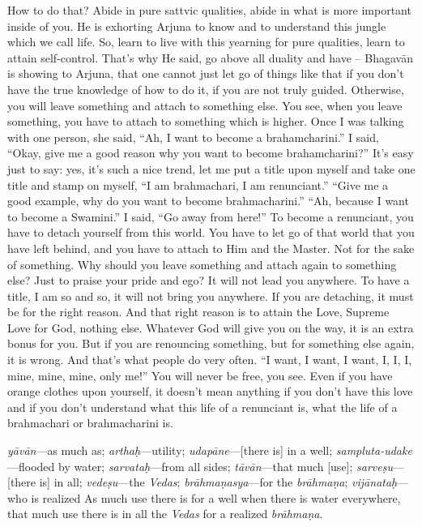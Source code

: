 How to do that? Abide in pure sattvic qualities, abide in what is more important inside of you. He is exhorting Arjuna to know and to understand this jungle which we call life. So, learn to live with this yearning for pure qualities, learn to attain self-control. That’s why He said, go above all duality and have – Bhagavān is showing to Arjuna, that one cannot just let go of things like that if you don’t have the true knowledge of how to do it, if you are not truly guided. Otherwise, you will leave something and attach to something else. You see, when you leave something, you have to attach to something which is higher. Once I was talking with one person, she said, “Ah, I want to become a brahamcharini.” I said, “Okay, give me a good reason why you want to become brahamcharini?” It’s easy just to say: yes, it’s such a nice trend, let me put a title upon myself and take one title and stamp on myself, “I am brahmachari, I am renunciant.” “Give me a good example, why do you want to become brahmacharini.” “Ah, because I want to become a Swamini.” I said, “Go away from here!” To become a renunciant, you have to detach yourself from this world. You have to let go of that world that you have left behind, and you have to attach to Him and the Master. Not for the sake of something. Why should you leave something and attach again to something else? Just to praise your pride and ego? It will not lead you anywhere. To have a title, I am so and so, it will not bring you anywhere. If you are detaching, it must be for the right reason. And that right reason is to attain the Love, Supreme Love for God, nothing else. Whatever God will give you on the way, it is an extra bonus for you. But if you are renouncing something, but for something else again, it is wrong. And that’s what people do very often. “I want, I want, I want, I, I, I, mine, mine, mine, only me!” You will never be free, you see. Even if you have orange clothes upon yourself, it doesn’t mean anything if you don’t have this love and if you don’t understand what this life of a renunciant is, what the life of a brahmachari or brahmacharini is.

{%
  \textit{yāvān}---as much as; 
  \textit{arthaḥ}---utility; 
  \textit{udapāne}---[there is] in a well; 
  \textit{sampluta-udake}---flooded by water; 
  \textit{sarvataḥ}---from all sides; 
  \textit{tāvān}---that much [use]; 
  \textit{sarveṣu}---[there is] in all; 
  \textit{vedeṣu}---the \textit{Vedas}; 
  \textit{brāhmaṇasya}---for the \textit{brāhmaṇa}; 
  \textit{vijānataḥ}---who is realized
}
{%
  As much use there is for a well when there is water everywhere, that much use there is in all the \textit{Vedas} for a realized \textit{brāhmaṇa}.
}

